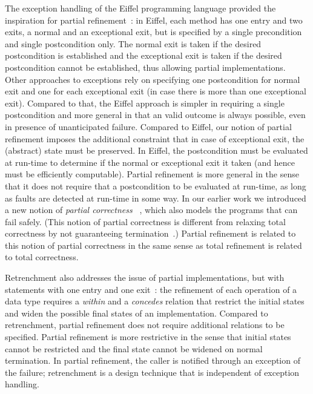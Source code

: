 \documentclass[submission,copyright,creativecommons]{eptcs}
\begin{document}
The exception handling of the Eiffel programming language provided the inspiration for partial refinement~\cite{Meyer97OOSoftwareConstruction}: in Eiffel, each method has one entry and two exits, a normal and an exceptional exit, but is specified by a single precondition and single postcondition only. The normal exit is taken if the desired postcondition is established and the exceptional exit is taken if the desired postcondition cannot be established, thus allowing partial implementations. Other approaches to  exceptions rely on specifying one postcondition for normal exit and one for each exceptional exit (in case there is more than one exceptional exit). Compared to that, the Eiffel approach is simpler in requiring a single postcondition and more general in that an valid outcome is always possible, even in presence of unanticipated failure. Compared to Eiffel, our notion of partial refinement imposes the additional constraint that in case of exceptional exit, the (abstract) state must be preserved. In Eiffel, the postcondition must be evaluated at run-time to determine if the normal or exceptional exit it taken (and hence must be efficiently computable). Partial refinement is more general  in the sense that it does not require that a postcondition to be evaluated at run-time, as long as faults are detected at run-time in some way. In our earlier work we introduced a new notion of {\em partial correctness}
~\cite{SekerinskiZhang11PartialCorrectness}, which also models the programs that can fail safely. (This notion of partial correctness is different from relaxing total correctness by not guaranteeing termination~\cite{JacobsGries85GeneralCorrectness}.) Partial refinement is related to this notion of partial correctness in the same sense as total refinement is related to total correctness.

Retrenchment also addresses the issue of partial implementations, but with statements with one entry and one exit~\cite{BanachaPoppletonJeskeaStepney07Retrenchment}: the refinement of each operation of a data type requires a \emph{within} and a \emph{concedes} relation that restrict the initial states and widen the possible final states of an implementation. Compared to retrenchment, partial refinement does not require additional relations to be specified. Partial refinement is more restrictive in the sense that initial states cannot be restricted and the final state cannot be widened on normal termination. In partial refinement, the caller is notified through an exception of the failure; retrenchment is a design technique that is independent of exception handling.
\end{document}
